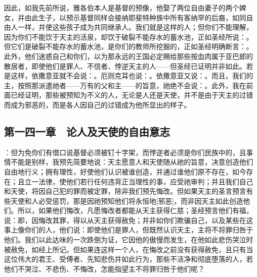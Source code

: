 因此，如我先前所说，雅各伯本人是基督的预像，他娶了两位自由妻子的两个婢女，并由此生子，以预示基督同样会接纳耶斐特种族中所有客纳罕的后裔，如同自由人一样，并使这些孩子成为共同继承人。我们就是这样的人；但你们不能理解，因为你们不能饮于天主的活泉，却饮于破裂不能存水的蓄水池，正如圣经所说：。但它们是破裂不能存水的蓄水池，是你们的教师所挖掘的，正如圣经明确断言：。此外，他们迷惑自己和你们，以为那永远的王国必定赐给那些按血肉属于亚巴郎的散居者，即使他们是罪人、不信者、悖逆天主的人——但圣经已证明并非如此。若是这样，依撒意亚就不会说：。厄则克耳也说：。依撒意亚又说：。而且，我们的主，按照那派遣祂者——万有的父和主——的旨意，祂绝不会说：。此外，我在前面已经证明，那些被预知为不义的人，无论是人还是天使，并不是由于天主的过错而成为邪恶的，而是各人因自己的过错成为他所显出的样子。\par


\subsection{第一四一章　论人及天使的自由意志}

：但为免你们有借口说基督必须被钉十字架，而悖逆者必须是你们民族中的，且事情不能是别样，我预先简要地说：天主愿意人和天使随从祂的旨意，决意创造他们自由地行义；拥有理性，好使他们认识被谁创造，并通过谁他们原不存在，如今存在；且立一法律，使他们若行任何违背正当理性的事，应受祂审判；并且我们自己和天使，将因自己犯的罪而被定罪，除非我们预先悔改。但如果天主的圣言预言有些天使和人必受惩罚，那是因祂预知他们将永恒地[邪恶]，而非因天主如此创造他们。所以，如果他们悔改，凡愿悔改者都能从天主获得仁慈；圣经预言他们有福，说：即，因悔改其罪，得以从天主获得赦免；并非如你们欺骗自己，以及某些在这事上像你们的人，他们说：即使他们是罪人，但既然认识天主，主将不将罪归咎于他们。我们以此达味的一次跌倒为证，它因他的傲慢而发生，在他如此悲伤哭泣时被赦免，如经上所记。但如果连这样一个人，在悔改之前没有获得赦免，且只有当这位伟大的君王、受傅者、先知悲伤并如此行为，那些不洁净和彻底堕落的人，若他们不哭泣、不悲伤、不悔改，怎能指望主不将罪归咎于他们呢？\par

